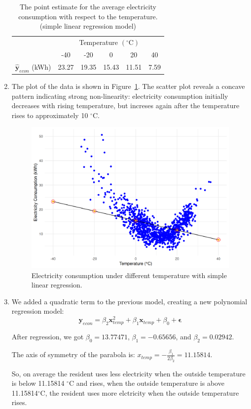 \documentclass[12pt]{article}
\begin{document}
\begin{enumerate}
\begin{table}[htpb]
	\centering
	\begin{tabular}{cccccc}
		\toprule
		\multirow{2}{*}{} &
		\multicolumn{5}{c}{Temperature $(^{\circ}\text{C})$}\\
		 & -40 & -20 & 0 & 20 & 40 \\
		\midrule
		$\hat{\mathbf{y}}_{econ}$ (kWh)&23.27&19.35&15.43&11.51&7.59\\
		\bottomrule
	\end{tabular}
	\caption{The point estimate for the average electricity consumption with respect to the temperature. (simple linear regression model)}
	\label{Tab:1}
\end{table}
\item The plot of the data is shown in Figure~\ref{Fig:1}.
The scatter plot reveals a concave pattern indicating strong non-linearity: electricity consumption initially decreases with rising temperature, but increses again after the temperature rises to approximately 10 $^{\circ}$C.
\begin{figure}[htbp]
\includegraphics[width=.7\textwidth]{1.png}
\centering
\caption{Electricity consumption under different temperature with simple linear regression.}
\label{Fig:1}
\end{figure}
\item We added a quadratic term to the previous model, creating a new polynomial regression model:
\[
\mathbf{y}_{econ} = \beta_2 \mathbf{x}_{temp}^{2}
+\beta_1 \mathbf{x}_{temp} + \beta_0 + \mathbf{\epsilon}
\] 

After regression, we got $\beta_0 = 13.77471$, $\beta_1 = -0.65656$, and $\beta_2 = 0.02942$.

The axis of symmetry of the parabola is: $x_{temp} =  -\frac{\beta_1}{2\beta_2} = 11.15814$.

So, on average the resident uses less electricity when the outside temperature is below 11.15814 $^{\circ}$C and rises, when the outside temperature is above 11.15814$^{\circ}$C, the resident uses more elctricity when the outside temperature rises.


\end{enumerate}
\end{document}
